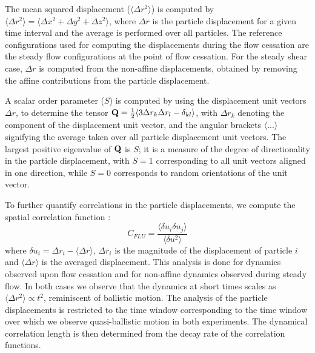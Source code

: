 \documentclass[%
preprint,
 amsmath,amssymb,
 aps,
]{revtex4-1}
\begin{document}
{{The mean squared displacement ($\langle \Delta r^2 \rangle$) is computed by $\langle \Delta r^2 \rangle = \langle \Delta x^2 + \Delta y^2 + \Delta z^2 \rangle$, where $\Delta r$ is the particle displacement for a given time interval and the average is performed over all particles. The reference configurations used for computing the displacements during the flow cessation are the steady flow configurations at the point of flow cessation. For the steady shear case, $\Delta r$ is computed from the non-affine displacements, obtained by removing the affine contributions from the particle displacement.

A scalar order parameter ($S$) is computed by using the displacement unit vectors $\hat{\Delta r}$, to determine the  tensor ${\bf Q} = \frac{1}{2}\langle 3 \Delta r_k \Delta r_l - \delta_{kl}\rangle$, with  $\Delta r_k$ denoting the component of the displacement unit vector, and the angular brackets $\langle ... \rangle$ signifying the average taken over all particle displacement unit vectors.  The  largest positive eigenvalue of ${\bf Q}$ is $S$; it is a measure of the degree of directionality in the particle displacement, with $S=1$ corresponding to all unit vectors aligned in one direction, while $S=0$ corresponds to random orientations of the unit vector. 

To further quantify correlations in the particle displacements, we compute the spatial correlation function \cite{weeks2007short}:
\begin{equation}\label{C_FLU}
C_{FLU} = \frac{\langle \delta u_i \delta u_j \rangle}{\langle \delta u^2 \rangle}
\end{equation}
where $\delta u_i = \Delta r_i - \langle \Delta r \rangle$,  $\Delta r_i$ is the magnitude of the displacement of particle $i$ and $\langle \Delta r \rangle$ is the averaged displacement. This analysis is done for dynamics observed upon flow cessation and for non-affine dynamics observed during steady flow. In both cases we observe that the dynamics at short times scales as  $\langle \Delta r^2 \rangle \propto t^2 $, reminiscent of ballistic motion.  The analysis of the particle displacements is restricted to the time window corresponding to the time window over which we observe quasi-ballistic motion in both experiments. 
The dynamical correlation length is then determined from the decay rate of the correlation functions. 

}}
\end{document}
